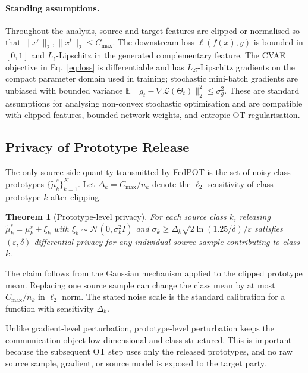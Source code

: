 \documentclass[a4paper,fleqn]{cas-sc}
\newtheorem{theorem}{Theorem}
\begin{document}
\paragraph{Standing assumptions.}
Throughout the analysis, source and target features are clipped or normalised
so that $\|x^s\|_2,\|x^t\|_2\leq C_{\max}$.
The downstream loss $\ell(f(x),y)$ is bounded in $[0,1]$ and
$L_\ell$-Lipschitz in the generated complementary feature.
The CVAE objective in Eq.~\eqref{eq:loss} is differentiable and has
$L_{\mathcal{L}}$-Lipschitz gradients on the compact parameter domain used in
training; stochastic mini-batch gradients are unbiased with bounded variance
$\mathbb{E}\|g_t-\nabla\mathcal{L}(\Theta_t)\|_2^2\leq\sigma_g^2$.
These are standard assumptions for analysing non-convex stochastic
optimisation and are compatible with clipped features, bounded network
weights, and entropic OT regularisation.

\subsection{Privacy of Prototype Release}

The only source-side quantity transmitted by FedPOT is the set of noisy class
prototypes $\{\tilde\mu_k^s\}_{k=1}^K$. Let
$\Delta_k=C_{\max}/n_k$ denote the $\ell_2$ sensitivity of class prototype
$k$ after clipping.

\begin{theorem}[Prototype-level privacy]
  For each source class $k$, releasing
  $\tilde\mu_k^s=\mu_k^s+\xi_k$ with
  $\xi_k\sim\mathcal{N}(0,\sigma_k^2 I)$ and
  $\sigma_k\geq \Delta_k\sqrt{2\ln(1.25/\delta)}/\varepsilon$
  satisfies $(\varepsilon,\delta)$-differential privacy for any individual
  source sample contributing to class $k$.
  \label{thm:proto_dp}
\end{theorem}

\begin{pf}
  The claim follows from the Gaussian mechanism applied to the clipped
  prototype mean. Replacing one source sample can change the class mean by
  at most $C_{\max}/n_k$ in $\ell_2$ norm. The stated noise scale is the
  standard calibration for a function with sensitivity $\Delta_k$.
\end{pf}

Unlike gradient-level perturbation, prototype-level perturbation keeps the
communication object low dimensional and class structured. This is important
because the subsequent OT step uses only the released prototypes, and no raw
source sample, gradient, or source model is exposed to the target party.
\end{document}
